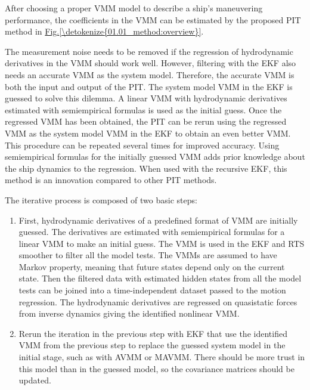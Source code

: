 \documentclass[review]{elsarticle}
\begin{document}
After choosing a proper VMM model to describe a ship’s maneuvering performance, the coefficients in the VMM can be estimated by the proposed PIT method in \hyperref[\detokenize{01.01_method:overview}]{Fig.\@ \ref{\detokenize{01.01_method:overview}}}.

The measurement noise needs to be removed if the regression of hydrodynamic derivatives in the VMM should work well. However, filtering with the EKF also needs an accurate VMM as the system model. Therefore, the accurate VMM is both the input and output of the PIT. The system model VMM in the EKF is guessed to solve this dilemma. A linear VMM with hydrodynamic derivatives estimated with semi\sphinxhyphen{}empirical formulas is used as the initial guess. Once the regressed VMM has been obtained, the PIT can be rerun using the regressed VMM as the system model VMM in the EKF to obtain an even better VMM. This procedure can be repeated several times for improved accuracy. Using semi\sphinxhyphen{}empirical formulas for the initially guessed VMM adds prior knowledge about the ship dynamics to the regression. When used with the recursive EKF, this method is an innovation compared to other PIT methods.

  
The iterative process is composed of two basic steps:
\begin{enumerate}
%
\item {} 
  
First, hydrodynamic derivatives of a predefined format of VMM are initially guessed. The derivatives are estimated with semi\sphinxhyphen{}empirical formulas for a linear VMM to make an initial guess. The VMM is used in the EKF and RTS smoother to filter all the model tests. The VMMs are assumed to have Markov property, meaning that future states depend only on the current state. Then the filtered data with estimated hidden states from all the model tests can be joined into a time-independent dataset passed to the motion regression. The hydrodynamic derivatives are regressed on quasi\sphinxhyphen{}static forces from inverse dynamics giving the identified nonlinear VMM.

\item {} 
  
Re\sphinxhyphen{}run the iteration in the previous step with EKF that use the identified VMM from the previous step to replace the guessed system model in the initial stage, such as with AVMM or MAVMM. There should be more trust in this model than in the guessed model, so the covariance matrices should be updated.

\end{enumerate}
\end{document}
